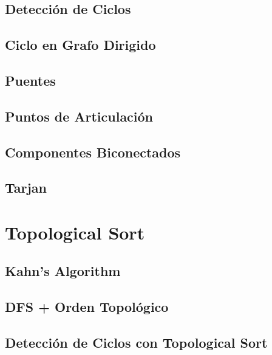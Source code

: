 \documentclass[10pt,a4paper,twocolumn]{article}
\begin{document}
\subsection{Detección de Ciclos}

\subsection{Ciclo en Grafo Dirigido}

\subsection{Puentes}

\subsection{Puntos de Articulación}

\subsection{Componentes Biconectados}

\subsection{Tarjan}



\section{Topological Sort}

\subsection{Kahn's Algorithm}

\subsection{DFS + Orden Topológico}

\subsection{Detección de Ciclos con Topological Sort}


\end{document}
